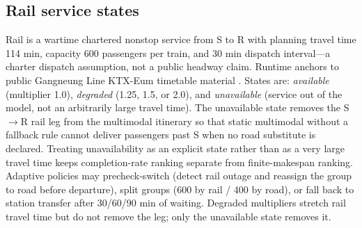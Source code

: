 \documentclass{ieeeaccess}
\begin{document}
\subsection{Rail service states}
Rail is a wartime chartered nonstop service from S to R with planning travel time 114 min, capacity 600 passengers per train, and 30 min dispatch interval---a charter dispatch assumption, not a public headway claim. Runtime anchors to public Gangneung Line KTX-Eum timetable material \cite{b18}. States are: \emph{available} (multiplier 1.0), \emph{degraded} (1.25, 1.5, or 2.0), and \emph{unavailable} (service out of the model, not an arbitrarily large travel time). The unavailable state removes the S$\rightarrow$R rail leg from the multimodal itinerary so that static multimodal without a fallback rule cannot deliver passengers past S when no road substitute is declared. Treating unavailability as an explicit state rather than as a very large travel time keeps completion-rate ranking separate from finite-makespan ranking. Adaptive policies may precheck-switch (detect rail outage and reassign the group to road before departure), split groups (600 by rail / 400 by road), or fall back to station transfer after 30/60/90 min of waiting. Degraded multipliers stretch rail travel time but do not remove the leg; only the unavailable state removes it.
\end{document}
